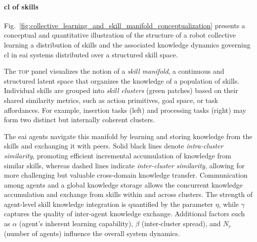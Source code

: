 \documentclass[12pt]{article}
\begin{document}
\paragraph*{\Acl{cl} of skills}
Fig.~\ref{fig:collective_learning_and_skill_manifold_conceptualization} presents a conceptual and quantitative illustration of the structure of a robot collective learning a distribution of skills and the associated knowledge dynamics governing \ac{cl} in \ac{eai} systems distributed over a structured skill space.

The \textsc{top} panel visualizes the notion of a \textit{skill manifold}, a continuous and structured latent space that organizes the knowledge of a population of skills. Individual skills are grouped into \textit{skill clusters} (green patches) based on their shared similarity metrics, such as action primitives, goal space, or task affordances. For example, insertion tasks (left) and processing tasks (right) may form two distinct but internally coherent clusters.

The \ac{eai} agents navigate this manifold by learning and storing knowledge from the skills and exchanging it with peers. Solid black lines denote \textit{intra-cluster similarity}, promoting efficient incremental accumulation of knowledge from similar skills, whereas dashed lines indicate \textit{inter-cluster similarity}, allowing for more challenging but valuable cross-domain knowledge transfer. Communication among agents and a global knowledge storage allows the concurrent knowledge accumulation and exchange from skills within and across clusters. The strength of agent-level skill knowledge integration is quantified by the parameter $\eta$, while $\gamma$ captures the quality of inter-agent knowledge exchange. Additional factors such as $\alpha$ (agent's inherent learning capability), $\beta$ (inter-cluster spread), and $N_r$ (number of agents) influence the overall system dynamics.
\end{document}
